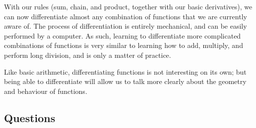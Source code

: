 With our rules (sum, chain, and product, together with our basic derivatives), we can now differentiate almost any
combination of functions that we are currently aware of. The process of differentiation is entirely mechanical, and
can be easily performed by a computer. As such, learning to differentiate more complicated combinations of functions
is very similar to learning how to add, multiply, and perform long division, and is only a matter of practice.

Like basic arithmetic, differentiating functions is not interesting on its own; but being able to differentiate
will allow us to talk more clearly about the geometry and behaviour of functions.

\clearpage
\subsection*{Questions}

